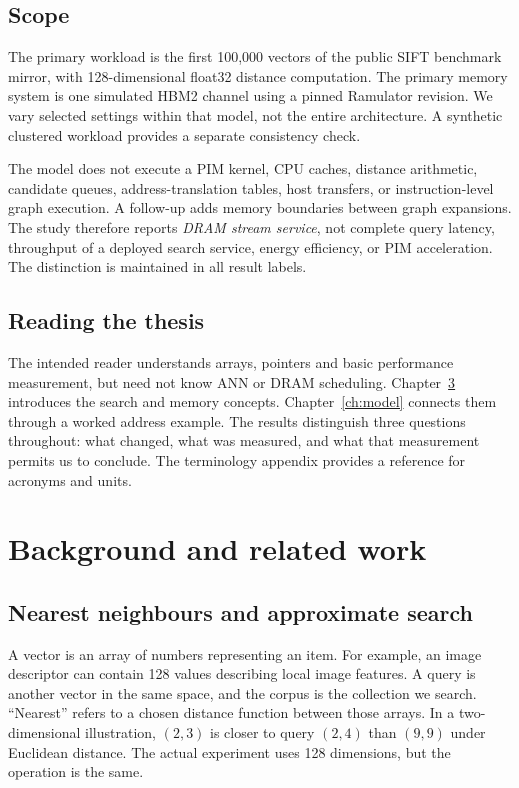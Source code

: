 \documentclass[11pt,a4paper]{report}
\begin{document}
\section{Scope}
The primary workload is the first 100,000 vectors of the public SIFT benchmark mirror, with 128-dimensional float32 distance computation. The primary memory system is one simulated HBM2 channel using a pinned Ramulator revision. We vary selected settings within that model, not the entire architecture. A synthetic clustered workload provides a separate consistency check.

The model does not execute a PIM kernel, CPU caches, distance arithmetic, candidate queues, address-translation tables, host transfers, or instruction-level graph execution. A follow-up adds memory boundaries between graph expansions. The study therefore reports \emph{DRAM stream service}, not complete query latency, throughput of a deployed search service, energy efficiency, or PIM acceleration. The distinction is maintained in all result labels.

\section{Reading the thesis}
The intended reader understands arrays, pointers and basic performance measurement, but need not know ANN or DRAM scheduling. Chapter~\ref{ch:background} introduces the search and memory concepts. Chapter~\ref{ch:model} connects them through a worked address example. The results distinguish three questions throughout: what changed, what was measured, and what that measurement permits us to conclude. The terminology appendix provides a reference for acronyms and units.

\chapter{Background and related work}
\label{ch:background}
\section{Nearest neighbours and approximate search}
A vector is an array of numbers representing an item. For example, an image descriptor can contain 128 values describing local image features. A query is another vector in the same space, and the corpus is the collection we search. ``Nearest'' refers to a chosen distance function between those arrays. In a two-dimensional illustration, $(2,3)$ is closer to query $(2,4)$ than $(9,9)$ under Euclidean distance. The actual experiment uses 128 dimensions, but the operation is the same.
\end{document}

